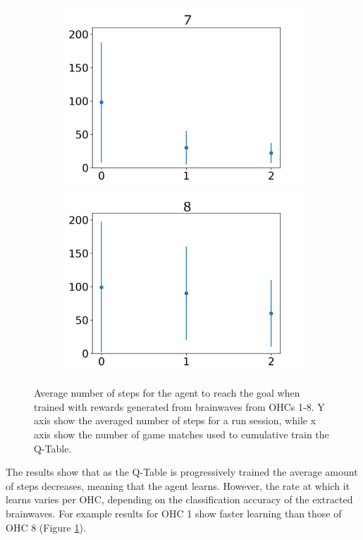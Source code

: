 \documentclass[journal]{IEEEtran}
\begin{document}
{{\begin{figure}[h!]
\begin{subfigure}{0.5\textwidth}
  \centering
  \includegraphics[scale=0.27]{Images/Average_steps/g.png}
  \includegraphics[scale=0.27]{Images/Average_steps/h.png}
\end{subfigure}
\caption{Average number of steps for the agent to reach the goal when trained with rewards generated from brainwaves from OHCs 1-8. Y axis show the averaged number of steps for a run session, while x axis show the number of game matches used to cumulative train the Q-Table.}
\label{fig:avg_steps}
\end{figure}


The results show that as the Q-Table is progressively trained the average amount of steps decreases, meaning that the agent learns. However, the rate at which it learns varies per OHC, depending on the classification accuracy of the extracted brainwaves.  For example results for OHC 1 show faster learning than those of OHC 8 (Figure \ref{fig:avg_steps}).

}}
\end{document}
